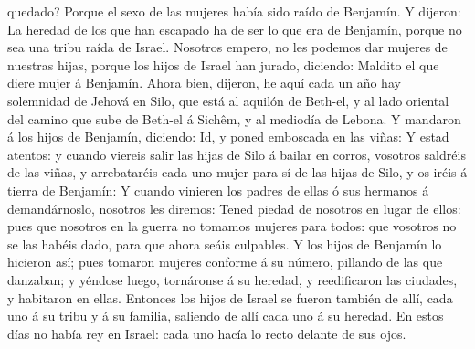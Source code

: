 quedado? Porque el sexo de las mujeres había sido raído de Benjamín.
 Y dijeron: La heredad de los que han escapado ha de ser
lo que era de Benjamín, porque no sea una tribu raída de Israel.
 Nosotros empero, no les podemos dar mujeres de nuestras
hijas, porque los hijos de Israel han jurado, diciendo: Maldito el que
diere mujer á Benjamín.  Ahora bien, dijeron, he aquí
cada un año hay solemnidad de Jehová en Silo, que está al aquilón de
Beth-el, y al lado oriental del camino que sube de Beth-el á Sichêm, y
al mediodía de Lebona.  Y mandaron á los hijos de
Benjamín, diciendo: Id, y poned emboscada en las viñas: 
Y estad atentos: y cuando viereis salir las hijas de Silo á bailar en
corros, vosotros saldréis de las viñas, y arrebataréis cada uno mujer
para sí de las hijas de Silo, y os iréis á tierra de Benjamín:
 Y cuando vinieren los padres de ellas ó sus hermanos á
demandárnoslo, nosotros les diremos: Tened piedad de nosotros en lugar
de ellos: pues que nosotros en la guerra no tomamos mujeres para todos:
que vosotros no se las habéis dado, para que ahora seáis culpables.
 Y los hijos de Benjamín lo hicieron así; pues tomaron
mujeres conforme á su número, pillando de las que danzaban; y yéndose
luego, tornáronse á su heredad, y reedificaron las ciudades, y habitaron
en ellas.  Entonces los hijos de Israel se fueron también
de allí, cada uno á su tribu y á su familia, saliendo de allí cada uno á
su heredad.  En estos días no había rey en Israel: cada
uno hacía lo recto delante de sus ojos.
